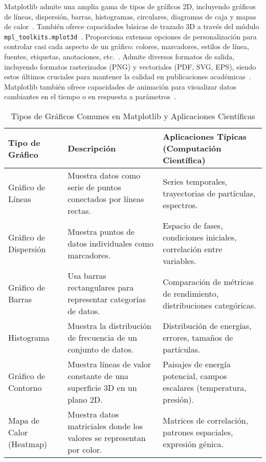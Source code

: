Matplotlib admite una amplia gama de tipos de gráficos 2D, incluyendo gráficos de líneas, dispersión, barras, histogramas, circulares, diagramas de caja y mapas de calor~\cite{VanderPlas2016}. También ofrece capacidades básicas de trazado 3D a través del módulo \texttt{mpl\_toolkits.mplot3d}~\cite{VanderPlas2016}. Proporciona extensas opciones de personalización para controlar casi cada aspecto de un gráfico: colores, marcadores, estilos de línea, fuentes, etiquetas, anotaciones, etc.~\cite{GeeksforGeeksIntroMPL, Vu2023}. Admite diversos formatos de salida, incluyendo formatos rasterizados (PNG) y vectoriales (PDF, SVG, EPS), siendo estos últimos cruciales para mantener la calidad en publicaciones académicas~\cite{Jones2012Matplotlib, Zhauniarovich2022}. Matplotlib también ofrece capacidades de animación para visualizar datos cambiantes en el tiempo o en respuesta a parámetros~\cite{llegodev2023}.

\begin{table}[htbp]
\centering
\caption{Tipos de Gráficos Comunes en Matplotlib y Aplicaciones Científicas}%
\label{tab:graficos_comunes}
\begin{tabular}{@{}p{}p{}p{}@{}}
\toprule
\textbf{Tipo de Gráfico}        & \textbf{Descripción}                                                          & \textbf{Aplicaciones Típicas (Computación Científica)}                                  \\
\midrule
Gráfico de Líneas      & Muestra datos como serie de puntos conectados por líneas rectas.     & Series temporales, trayectorias de partículas, espectros.                      \\
Gráfico de Dispersión  & Muestra puntos de datos individuales como marcadores.                & Espacio de fases, condiciones iniciales, correlación entre variables.          \\
Gráfico de Barras      & Usa barras rectangulares para representar categorías de datos.         & Comparación de métricas de rendimiento, distribuciones categóricas.          \\
Histograma             & Muestra la distribución de frecuencia de un conjunto de datos.       & Distribución de energías, errores, tamaños de partículas.                     \\
Gráfico de Contorno    & Muestra líneas de valor constante de una superficie 3D en un plano 2D. & Paisajes de energía potencial, campos escalares (temperatura, presión).       \\
Mapa de Calor (Heatmap)& Muestra datos matriciales donde los valores se representan por color. & Matrices de correlación, patrones espaciales, expresión génica.             \\
\bottomrule
\end{tabular}
\end{table}

